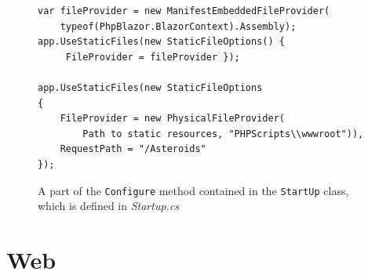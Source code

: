 \begin{figure}
\begin{lstlisting}
var fileProvider = new ManifestEmbeddedFileProvider(
	typeof(PhpBlazor.BlazorContext).Assembly);
app.UseStaticFiles(new StaticFileOptions() {
	 FileProvider = fileProvider });

app.UseStaticFiles(new StaticFileOptions
{
	FileProvider = new PhysicalFileProvider(
		Path to static resources, "PHPScripts\\wwwroot")),
	RequestPath = "/Asteroids"
});
\end{lstlisting}
\caption{A part of the \texttt{Configure} method contained in the \texttt{StartUp} class, which is defined in \textit{Startup.cs}}
\label{img21:server}
\end{figure}

\section{Web}

